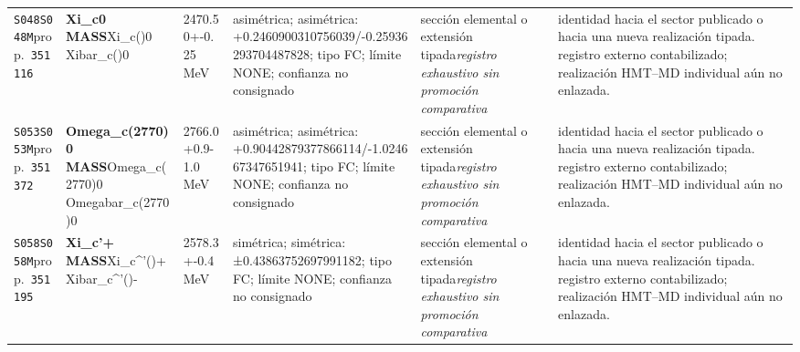 \begin{landscape}
\begin{longtable}{L{1.85cm}L{4.45cm}L{2.35cm}L{4.05cm}L{3.35cm}L{7.15cm}}
\texttt{S048}\newline \texttt{S048M}\newline prop.\ \texttt{351116} & \textbf{Xi\_\allowbreak{}c0 MASS}\newline Xi\_\allowbreak{}c()0 \textbar{}\allowbreak{} Xibar\_\allowbreak{}c()0 & 2470.50+-0.25\,MeV & asimétrica; asimétrica: +0.2460900310756039/-0.25936293704487828; tipo FC; límite NONE; confianza no consignado & sección elemental o extensión tipada\newline \emph{registro exhaustivo sin promoción comparativa} & identidad hacia el sector publicado o hacia una nueva realización tipada. registro externo contabilizado; realización HMT--MD individual aún no enlazada. \\
\texttt{S053}\newline \texttt{S053M}\newline prop.\ \texttt{351372} & \textbf{Omega\_\allowbreak{}c(2770)0 MASS}\newline Omega\_\allowbreak{}c(2770)0 \textbar{}\allowbreak{} Omegabar\_\allowbreak{}c(2770)0 & 2766.0+0.9-1.0\,MeV & asimétrica; asimétrica: +0.90442879377866114/-1.024667347651941; tipo FC; límite NONE; confianza no consignado & sección elemental o extensión tipada\newline \emph{registro exhaustivo sin promoción comparativa} & identidad hacia el sector publicado o hacia una nueva realización tipada. registro externo contabilizado; realización HMT--MD individual aún no enlazada. \\
\texttt{S058}\newline \texttt{S058M}\newline prop.\ \texttt{351195} & \textbf{Xi\_\allowbreak{}c'+ MASS}\newline Xi\_\allowbreak{}c\textasciicircum{}'()+ \textbar{}\allowbreak{} Xibar\_\allowbreak{}c\textasciicircum{}'()- & 2578.3+-0.4\,MeV & simétrica; simétrica: ±0.43863752697991182; tipo FC; límite NONE; confianza no consignado & sección elemental o extensión tipada\newline \emph{registro exhaustivo sin promoción comparativa} & identidad hacia el sector publicado o hacia una nueva realización tipada. registro externo contabilizado; realización HMT--MD individual aún no enlazada. \\

\end{longtable}
\end{landscape}
